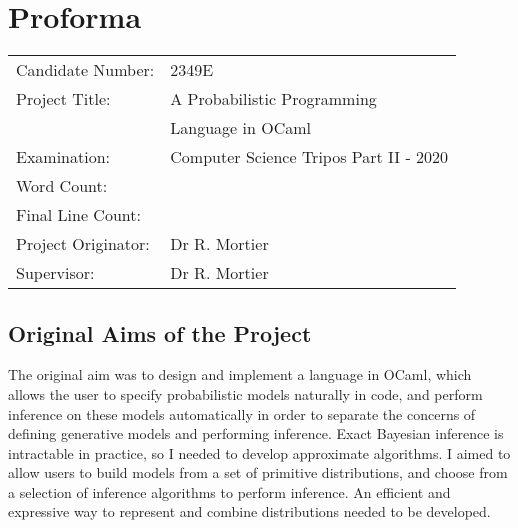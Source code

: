 \immediate{}
\immediate{}
\chapter*{Proforma}
{\large
	\begin{tabular}{ll}
		Candidate Number:   & 2349E                                  \\
		Project Title:      & A Probabilistic Programming            \\
		                    & Language in OCaml                      \\
		Examination:        & Computer Science Tripos Part II - 2020 \\
		Word Count:         & \footnotemark[1]  \\
		Final Line Count:   & \footnotemark[2]  \\
		Project Originator: & Dr R. Mortier                          \\
		Supervisor:         & Dr R. Mortier                          \\
	\end{tabular}
}


\section*{Original Aims of the Project}

The original aim was to design and implement a language in OCaml, which allows the user to specify probabilistic models naturally in code, and perform inference on these models automatically in order to separate the concerns of defining generative models and performing inference. Exact Bayesian inference is intractable in practice, so I needed to develop approximate algorithms. I aimed to allow users to build models from a set of primitive distributions, and choose from a selection of inference algorithms to perform inference. An efficient and expressive way to represent and combine distributions needed to be developed.


